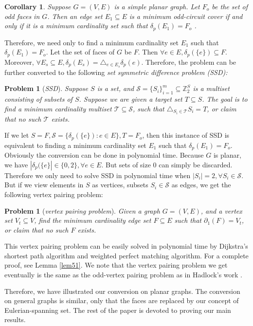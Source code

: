 \documentclass[10pt,fleqn]{article}
\newtheorem{problem}[theorem]{Problem}
\newtheorem{corollary}[theorem]{Corollary}
\newcommand{\Z}{\mathbb{Z}}
\newcommand{\mc}[1]{\mathcal{#1}}
\begin{document}
	\begin{corollary}\label{col01}
		Suppose $G=(V,E)$ is a simple planar graph. Let $F_o$ be the set of odd faces in $G$. Then an edge set $E_1\subseteq E$ is a minimum odd-circuit cover if and only if it is a minimum cardinality set such that $\delta_p(E_1)=F_o$ .
	\end{corollary} \par
	Therefore, we need only to find a minimum cardinality set $E_1$ such that $\delta_p(E_1)=F_o$. Let the set of faces of $G$ be $F$. Then $\forall e\in E, \delta_p(\{e\})\subseteq F$. Moreover, $\forall E_s\subseteq E,\delta_{p}(E_s)=\triangle_{e\in E_s}\delta_p(e)$. Therefore, the problem can be further converted to the following \emph{set symmetric difference problem (SSD):}
	\begin{problem}[\it{SSD}]\label{prb01}
		Suppose $S$ is a set, and $\mathcal{S}=\{S_i\}_{i=1}^{m}\subseteq\Z_2^S$ is a multiset consisting of subsets of $S$. Suppose we are given a target set $T\subseteq S$. The goal is to find a minimum cardinality multiset $\mathcal{T}\subseteq\mc{S}$, such that $\triangle_{S_i\in\mc{T}}S_i=T$, or claim that no such $\mc{T}$ exists.
	\end{problem} \par
	If we let $S=F,\mc{S}=\{\delta_p(\{e\}):e\in E\},T=F_o$, then this instance of SSD is equivalent to finding a minimum cardinality set $E_1$ such that $\delta_p(E_1)=F_o$. Obviously the conversion can be done in polynomial time. Because $G$ is planar, we have $|\delta_p(\{e\}|\in\{0,2\},\forall e\in E$. But sets of size 0 can simply be discarded. Therefore we only need to solve SSD in polynomial time when $|S_i|=2,\forall S_i\in\mc{S}$. But if we view elements in $S$ as vertices, subsets $S_i\in\mc{S}$ as edges, we get the following vertex pairing problem:
	\begin{problem}[\it{vertex pairing problem}]
		Given a graph $G=(V,E)$, and a vertex set $V_t\subseteq V$, find the minimum cardinality edge set $F\subseteq E$ such that $\partial_1(F)=V_t$, or claim that no such $F$ exists.
	\end{problem}
	This vertex pairing problem can be easily solved in polynomial time by Dijkstra's shortest path algorithm and weighted perfect matching algorithm. For a complete proof, see Lemma \ref{lem51}. We note that the vertex pairing problem we get eventually is the same as the odd-vertex pairing problem as in Hadlock's work \cite{79}. \par
	Therefore, we have illustrated our conversion on planar graphs. The conversion on general graphs is similar, only that the faces are replaced by our concept of Eulerian-spanning set. The rest of the paper is devoted to proving our main results.
\end{document}
